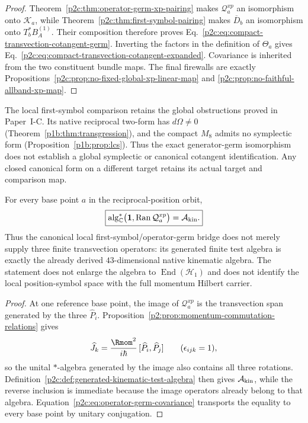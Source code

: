 \documentclass[12pt,a4paper]{article}
\begin{document}
\begin{proof}
Theorem~\ref{p2c:thm:operator-germ-xp-pairing} makes
$\mathcal Q_a^{xp}$ an isomorphism onto $\mathscr K_a$, while
Theorem~\ref{p2c:thm:first-symbol-pairing} makes $\overline D_b$ an
isomorphism onto $T_b^*B_A^{(1)}$.  Their composition therefore proves
Eq.~\eqref{p2c:eq:compact-transvection-cotangent-germ}.  Inverting the factors
in the definition of $\Theta_a$ gives
Eq.~\eqref{p2c:eq:compact-transvection-cotangent-expanded}.  Covariance is
inherited from the two constituent bundle maps.  The final firewalls are
exactly Propositions~\ref{p2c:prop:no-fixed-global-xp-linear-map} and
\ref{p2c:prop:no-faithful-allband-xp-map}.
\end{proof}


\begin{remark}
\label{p2c:rem:global-symplectic-obstruction}
The local first-symbol comparison retains the global obstructions proved
in Paper~I-C.  Its native reciprocal two-form has
$d\Omega\ne0$ (Theorem~\ref{p1b:thm:transgression}), and the compact
$M_8$ admits no symplectic form (Proposition~\ref{p1b:prop:lcs}).
Thus the exact generator-germ isomorphism does not establish a global
symplectic or canonical cotangent identification.  Any closed canonical
form on a different target retains its actual target and comparison map.
\end{remark}

\begin{corollary}
\label{p2c:cor:v185-first-symbol-generates-akin}
For every base point $a$ in the reciprocal-position orbit,
\[
 \boxed{
 \operatorname{alg}_{\mathbb C}^{*}
 \bigl(\mathbf1,\operatorname{Ran}\mathcal Q_a^{xp}\bigr)
 =\mathcal A_{\rm kin}.}
\]
Thus the canonical local first-symbol/operator-germ bridge does not merely
supply three finite transvection operators: its generated finite test algebra
is exactly the already derived $43$-dimensional native kinematic algebra.  The
statement does not enlarge the algebra to $\operatorname{End}(\mathcal H_1)$
and does not identify the local position-symbol space with the full momentum
Hilbert carrier.
\end{corollary}
\begin{proof}
At one reference base point, the image of $\mathcal Q_a^{xp}$ is the
transvection span generated by the three $\widehat P_i$.  Proposition~\ref{p2:prop:momentum-commutation-relations}
gives
\[
 \widehat J_k
 =\frac{\Rmom^2}{i\hbar}\,[\widehat P_i,\widehat P_j]
 \qquad (\epsilon_{ijk}=1),
\]
so the unital $*$-algebra generated by the image also contains all three
rotations.  Definition~\ref{p2c:def:generated-kinematic-test-algebra} then
gives $\mathcal A_{\rm kin}$, while the reverse inclusion is immediate because
the image operators already belong to that algebra.  Equation~\ref{p2c:eq:operator-germ-covariance}
transports the equality to every base point by unitary conjugation.
\end{proof}
\end{document}
